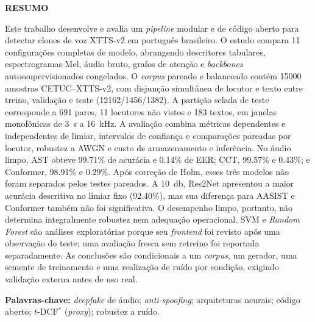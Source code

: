 \documentclass[12pt,a4paper]{article}
\begin{document}
\begin{center}\textbf{RESUMO}\end{center}
\vspace{0.5cm}
\begin{singlespace}
	\noindent
	Este trabalho desenvolve e avalia um \textit{pipeline} modular e de código
	aberto para detectar clones de voz XTTS-v2 em português brasileiro. O estudo
	compara \num{11} configurações completas de modelo, abrangendo descritores
	tabulares, espectrogramas Mel, áudio bruto, grafos de atenção e
	\textit{backbones} autossupervisionados congelados. O \textit{corpus} pareado e
	balanceado contém \num{15000} amostras CETUC--XTTS-v2, com disjunção simultânea
	de locutor e texto entre treino, validação e teste
	(\num{12162}/\num{1456}/\num{1382}). A partição selada de teste corresponde a
	\num{691} pares, \num{11} locutores não vistos e \num{183} textos, em janelas
	monofônicas de \SI{3}{\second} a \SI{16}{\kilo\hertz}. A avaliação combina
	métricas dependentes e independentes de limiar, intervalos de confiança e
	comparações pareadas por locutor, robustez a AWGN e custo de armazenamento e
	inferência. No áudio limpo, AST obteve \num{99,71}\% de acurácia e
	\num{0,14}\% de EER; CCT, \num{99,57}\% e \num{0,43}\%; e Conformer,
	\num{98,91}\% e \num{0,29}\%. Após correção de Holm, esses três modelos não
	foram separados pelos testes pareados. A \SI{10}{\decibel}, Res2Net apresentou
	a maior acurácia descritiva no limiar fixo (\num{92,40}\%), mas sua diferença
	para AASIST e Conformer também não foi significativa. O desempenho limpo,
	portanto, não determina integralmente robustez nem adequação operacional. SVM
	e \textit{Random Forest} são análises exploratórias porque seu \textit{frontend}
	foi revisto após uma observação do teste; uma avaliação fresca sem retreino
	foi reportada separadamente. As conclusões são condicionais a um \textit{corpus},
	um gerador, uma semente de treinamento e uma realização de ruído por condição,
	exigindo validação externa antes de uso real.
	
	\vspace{0.4cm}
	\noindent\textbf{Palavras-chave:} \textit{deepfake} de áudio;
	\textit{anti-spoofing}; arquiteturas neurais; código aberto;
	$t$-DCF$^\ast$ (\textit{proxy}); robustez a ruído.
\end{singlespace}
\end{document}
